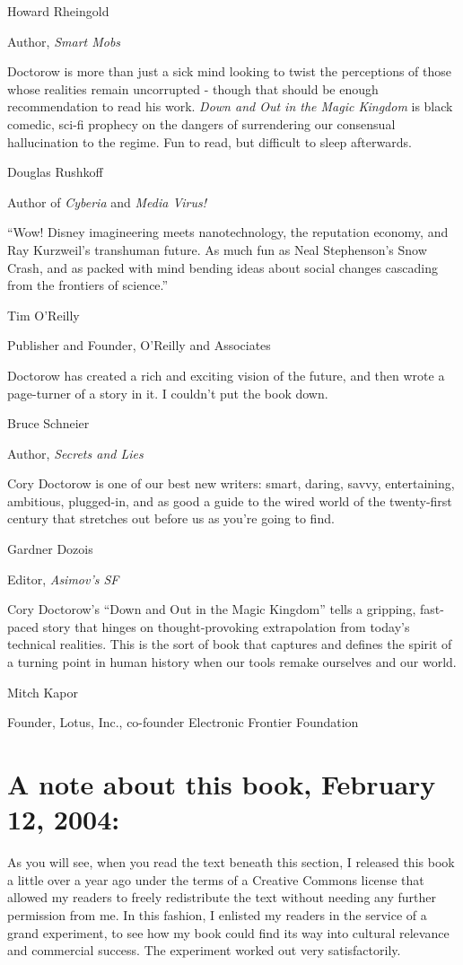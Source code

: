 Howard Rheingold

Author, \emph{Smart Mobs}

Doctorow is more than just a sick mind looking to twist the
perceptions of those whose realities remain uncorrupted - though
that should be enough recommendation to read his work.
\emph{Down and Out in the Magic Kingdom} is black comedic, sci-fi
prophecy on the dangers of surrendering our consensual
hallucination to the regime. Fun to read, but difficult to sleep
afterwards.

Douglas Rushkoff

Author of \emph{Cyberia} and \emph{Media Virus!}

“Wow! Disney imagineering meets nanotechnology, the reputation
economy, and Ray Kurzweil's transhuman future. As much fun as Neal
Stephenson's Snow Crash, and as packed with mind bending ideas
about social changes cascading from the frontiers of science.”

Tim O'Reilly

Publisher and Founder, O'Reilly and Associates

Doctorow has created a rich and exciting vision of the future, and
then wrote a page-turner of a story in it. I couldn't put the book
down.

Bruce Schneier

Author, \emph{Secrets and Lies}

Cory Doctorow is one of our best new writers: smart, daring, savvy,
entertaining, ambitious, plugged-in, and as good a guide to the
wired world of the twenty-first century that stretches out before
us as you're going to find.

Gardner Dozois

Editor, \emph{Asimov's SF}

Cory Doctorow's “Down and Out in the Magic Kingdom” tells a
gripping, fast-paced story that hinges on thought-provoking
extrapolation from today's technical realities. This is the sort of
book that captures and defines the spirit of a turning point in
human history when our tools remake ourselves and our world.

Mitch Kapor

Founder, Lotus, Inc., co-founder Electronic Frontier Foundation

\section{A note about this book, February 12, 2004:}

As you will see, when you read the text beneath this section, I
released this book a little over a year ago under the terms of a
Creative Commons license that allowed my readers to freely
redistribute the text without needing any further permission from
me. In this fashion, I enlisted my readers in the service of a
grand experiment, to see how my book could find its way into
cultural relevance and commercial success. The experiment worked
out very satisfactorily.

